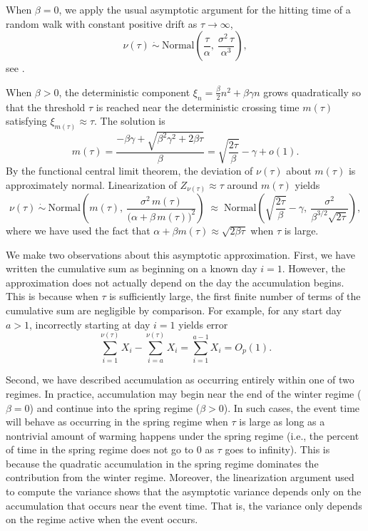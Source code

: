 \documentclass[
]{article}
\begin{document}
{When \(\beta=0\), we apply the usual asymptotic argument for
the hitting time of a random walk with constant positive drift as \(\tau \to \infty\), \[
\nu(\tau)\ \dot{\sim}\ \mathrm{Normal}\!\left(\frac{\tau}{\alpha},\ \frac{\sigma^2\,\tau}{\alpha^{3}}\right),
\] see \cite{gut2009stopped}.

When \(\beta>0\), the deterministic component
\(\xi_n=\frac{\beta}{2}n^2+\beta\gamma n\) grows quadratically so that
the threshold \(\tau\) is reached near the deterministic crossing time
\(m(\tau)\) satisfying \(\xi_{m(\tau)}\approx \tau\). The solution is \[
m(\tau)=\frac{-\beta\gamma+\sqrt{\beta^2\gamma^2+2\beta \tau}}{\beta}
=
\sqrt{\frac{2\tau}{\beta}}-\gamma+o(1).
\] By the functional central limit theorem, the deviation of \(\nu(\tau)\)
about \(m(\tau)\) is approximately normal. Linearization of
\(Z_{\nu(\tau)}\approx \tau\) around \(m(\tau)\) yields \[
\nu(\tau)\ \dot{\sim}\ \mathrm{Normal}\!\left(m(\tau),\ \frac{\sigma^2\,m(\tau)}{\bigl(\alpha+\beta\,m(\tau)\bigr)^2}\right)
\;\approx\;
\mathrm{Normal}\!\left(\sqrt{\frac{2\tau}{\beta}}-\gamma,\ \frac{\sigma^2}{\beta^{3/2}\sqrt{2\tau}}\right),
\] where we have used the fact that
\(\alpha+\beta m(\tau) \approx \sqrt{2\beta \tau}\) when
\(\tau\) is large. 

We make two observations about this asymptotic approximation. First, we have written the cumulative sum as beginning on a known day \(i = 1\). 
However, the approximation does not actually depend on the day the accumulation begins. This is because when \(\tau\) is sufficiently large, the first finite number of terms of the cumulative sum are negligible by comparison. For example, for any start day \(a > 1\), incorrectly starting at day \(i = 1\) yields error \[\sum_{i=1}^{\nu(\tau)}X_i-\sum_{i=a}^{\nu(\tau)}X_i = \sum_{i=1}^{a-1}X_i = O_p(1).\]

Second, we have described accumulation as occurring entirely within one of two regimes. In practice, accumulation may begin near the end of the winter regime (\(\beta = 0 \)) 
and continue into the spring regime (\(\beta > 0\)). In such cases, the event time will behave as occurring in the spring regime when \(\tau\) is large as long as a nontrivial 
amount of warming happens under  the spring regime (i.e., the percent of time in the spring regime does not go to 0 as \(\tau\) goes to infinity). This is because the 
quadratic accumulation in the spring regime dominates the contribution from the winter regime.  Moreover, the linearization argument used to compute the 
variance shows that the asymptotic variance depends only on the accumulation that occurs near the event time. That is, the variance only depends on 
the regime active when the event occurs.

}
\end{document}
